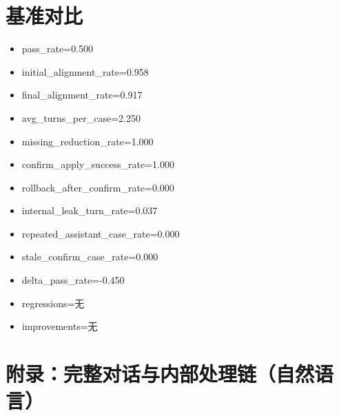 \documentclass[11pt]{ctexart}
\begin{document}
\section{基准对比}
\begin{itemize}
\item pass\_rate=0.500
\item initial\_alignment\_rate=0.958
\item final\_alignment\_rate=0.917
\item avg\_turns\_per\_case=2.250
\item missing\_reduction\_rate=1.000
\item confirm\_apply\_success\_rate=1.000
\item rollback\_after\_confirm\_rate=0.000
\item internal\_leak\_turn\_rate=0.037
\item repeated\_assistant\_case\_rate=0.000
\item stale\_confirm\_case\_rate=0.000
\item delta\_pass\_rate=-0.450
\item regressions=无
\item improvements=无
\end{itemize}
\appendix
\section{附录：完整对话与内部处理链（自然语言）}
\end{document}
